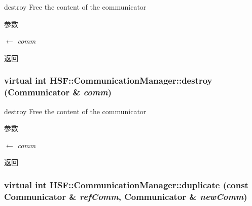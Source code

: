 destroy Free the content of the communicator 
\begin{DoxyParams}{参数}
\item[\mbox{$\leftarrow$} {\em comm}]\end{DoxyParams}
\begin{DoxyReturn}{返回}

\end{DoxyReturn}
\hypertarget{classHSF_1_1CommunicationManager_ab1ce47822ae286b8e08be0a796f3feea}{
\subsubsection[{destroy}]{\setlength{\rightskip}{0pt plus 5cm}virtual int HSF::CommunicationManager::destroy ({\bf Communicator} \& {\em comm})}}
\label{classHSF_1_1CommunicationManager_ab1ce47822ae286b8e08be0a796f3feea}


destroy Free the content of the communicator 
\begin{DoxyParams}{参数}
\item[\mbox{$\leftarrow$} {\em comm}]\end{DoxyParams}
\begin{DoxyReturn}{返回}

\end{DoxyReturn}
\hypertarget{classHSF_1_1CommunicationManager_aa506879f09f9f0d3853a38bd5957024d}{
\subsubsection[{duplicate}]{\setlength{\rightskip}{0pt plus 5cm}virtual int HSF::CommunicationManager::duplicate (const {\bf Communicator} \& {\em refComm}, \/  {\bf Communicator} \& {\em newComm})}}
\label{classHSF_1_1CommunicationManager_aa506879f09f9f0d3853a38bd5957024d}


